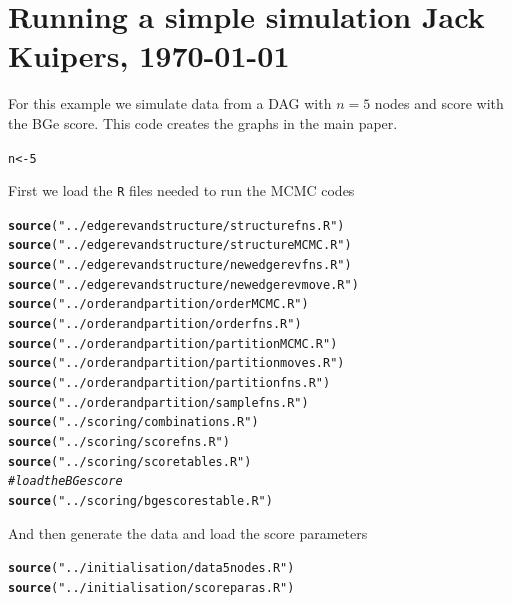 \documentclass[a4paper]{article}\usepackage[]{graphicx}\usepackage[]{color}
\makeatletter
\newcommand{\hlnum}[1]{\textcolor[rgb]{0.686,0.059,0.569}{#1}}%
\newcommand{\hlstr}[1]{\textcolor[rgb]{0.192,0.494,0.8}{#1}}%
\newcommand{\hlcom}[1]{\textcolor[rgb]{0.678,0.584,0.686}{\textit{#1}}}%
\newcommand{\hlstd}[1]{\textcolor[rgb]{0.345,0.345,0.345}{#1}}%
\newcommand{\hlkwb}[1]{\textcolor[rgb]{0.69,0.353,0.396}{#1}}%
\newcommand{\hlkwd}[1]{\textcolor[rgb]{0.737,0.353,0.396}{\textbf{#1}}}%
\newenvironment{kframe}{%
 \def\at@end@of@kframe{}%
 \ifinner\ifhmode%
  \def\at@end@of@kframe{\end{minipage}}%
  \begin{minipage}{\columnwidth}%
 \fi\fi%
 \def\FrameCommand##1{\hskip\@totalleftmargin \hskip-\fboxsep
 \colorbox{shadecolor}{##1}\hskip-\fboxsep
     \hskip-\linewidth \hskip-\@totalleftmargin \hskip\columnwidth}%
 \MakeFramed {\advance\hsize-\width
   \@totalleftmargin\z@ \linewidth\hsize
   \@setminipage}}%
 {\par\unskip\endMakeFramed%
 \at@end@of@kframe}
\newenvironment{knitrout}{}{} %
\newcommand{\nn}{\noindent}
\makeatother
\begin{document}
\section*{Running a simple simulation \hfill \normalsize{\textnormal{Jack Kuipers, \today}}}

\nn For this example we simulate data from a DAG with $n=5$ nodes and score with the BGe score.  This code creates the graphs in the main paper.

\begin{knitrout}
\color{fgcolor}\begin{kframe}
\begin{alltt}
\hlstd{n} \hlkwb{<-} \hlnum{5}
\end{alltt}
\end{kframe}
\end{knitrout}

\nn First we load the \texttt{R} files needed to run the MCMC codes
\begin{knitrout}
\color{fgcolor}\begin{kframe}
\begin{alltt}
\hlkwd{source}\hlstd{(}\hlstr{"../edgerevandstructure/structurefns.R"}\hlstd{)}
\hlkwd{source}\hlstd{(}\hlstr{"../edgerevandstructure/structureMCMC.R"}\hlstd{)}
\hlkwd{source}\hlstd{(}\hlstr{"../edgerevandstructure/newedgerevfns.R"}\hlstd{)}
\hlkwd{source}\hlstd{(}\hlstr{"../edgerevandstructure/newedgerevmove.R"}\hlstd{)}
\hlkwd{source}\hlstd{(}\hlstr{"../orderandpartition/orderMCMC.R"}\hlstd{)}
\hlkwd{source}\hlstd{(}\hlstr{"../orderandpartition/orderfns.R"}\hlstd{)}
\hlkwd{source}\hlstd{(}\hlstr{"../orderandpartition/partitionMCMC.R"}\hlstd{)}
\hlkwd{source}\hlstd{(}\hlstr{"../orderandpartition/partitionmoves.R"}\hlstd{)}
\hlkwd{source}\hlstd{(}\hlstr{"../orderandpartition/partitionfns.R"}\hlstd{)}
\hlkwd{source}\hlstd{(}\hlstr{"../orderandpartition/samplefns.R"}\hlstd{)}
\hlkwd{source}\hlstd{(}\hlstr{"../scoring/combinations.R"}\hlstd{)}
\hlkwd{source}\hlstd{(}\hlstr{"../scoring/scorefns.R"}\hlstd{)}
\hlkwd{source}\hlstd{(}\hlstr{"../scoring/scoretables.R"}\hlstd{)}
\hlcom{# load the BGe score}
\hlkwd{source}\hlstd{(}\hlstr{"../scoring/bgescorestable.R"}\hlstd{)}
\end{alltt}
\end{kframe}
\end{knitrout}

\nn And then generate the data and load the score parameters
\begin{knitrout}
\color{fgcolor}\begin{kframe}
\begin{alltt}
\hlkwd{source}\hlstd{(}\hlstr{"../initialisation/data5nodes.R"}\hlstd{)}
\hlkwd{source}\hlstd{(}\hlstr{"../initialisation/scoreparas.R"}\hlstd{)}
\end{alltt}
\end{kframe}
\end{knitrout}
\end{document}
